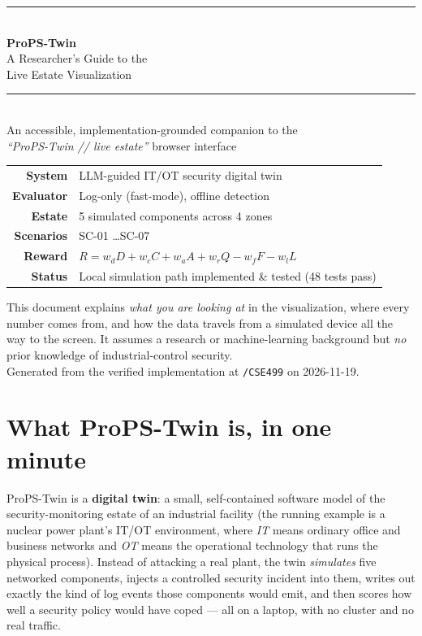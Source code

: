\documentclass[11pt]{article}
\newcommand{\file}[1]{\textcolor{mfpurple}{\texttt{\small #1}}}
\begin{document}
\begin{titlepage}
\centering
\vspace*{2cm}
{\color{mfpurple}\rule{\linewidth}{1.2pt}}\\[8pt]
{\Huge\bfseries ProPS-Twin}\\[6pt]
{\LARGE A Researcher's Guide to the\\ Live Estate Visualization}\\[10pt]
{\color{mfpurple}\rule{\linewidth}{1.2pt}}\\[14pt]
{\large An accessible, implementation-grounded companion to the\\
\emph{``ProPS-Twin // live estate''} browser interface}\\[1.2cm]

\begin{tabular}{rl}
\textbf{System} & LLM-guided IT/OT security digital twin\\
\textbf{Evaluator} & Log-only (fast-mode), offline detection\\
\textbf{Estate} & 5 simulated components across 4 zones\\
\textbf{Scenarios} & SC-01 \ldots SC-07\\
\textbf{Reward} & $R = w_dD + w_cC + w_aA + w_rQ - w_fF - w_lL$\\
\textbf{Status} & Local simulation path implemented \& tested (48 tests pass)\\
\end{tabular}

\vfill
{\small This document explains \emph{what you are looking at} in the visualization,
where every number comes from, and how the data travels from a simulated device
all the way to the screen. It assumes a research or machine-learning background
but \emph{no} prior knowledge of industrial-control security.}\\[6pt]
{\small\color{mfgray}Generated from the verified implementation at
\file{/CSE499} on 2026-11-19.}
\end{titlepage}

\tableofcontents
\clearpage

\section{What ProPS-Twin is, in one minute}

ProPS-Twin is a \textbf{digital twin}: a small, self-contained software model of
the security-monitoring estate of an industrial facility (the running example is
a nuclear power plant's IT/OT environment, where \emph{IT} means ordinary office
and business networks and \emph{OT} means the operational technology that runs
the physical process). Instead of attacking a real plant, the twin
\emph{simulates} five networked components, injects a controlled security
incident into them, writes out exactly the kind of log events those components
would emit, and then scores how well a security policy would have coped --- all
on a laptop, with no cluster and no real traffic.
\end{document}

